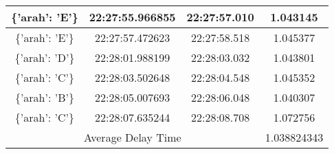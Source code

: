 \begin{longtable}{|ccc|c|}
    \multicolumn{1}{|c|}{\{'arah': 'E'\}} & \multicolumn{1}{c|}{22:27:55.966855} & 22:27:57.010       & 1.043145    \\ \hline
    \multicolumn{1}{|c|}{\{'arah': 'E'\}} & \multicolumn{1}{c|}{22:27:57.472623} & 22:27:58.518       & 1.045377    \\ \hline
    \multicolumn{1}{|c|}{\{'arah': 'D'\}} & \multicolumn{1}{c|}{22:28:01.988199} & 22:28:03.032       & 1.043801    \\ \hline
    \multicolumn{1}{|c|}{\{'arah': 'C'\}} & \multicolumn{1}{c|}{22:28:03.502648} & 22:28:04.548       & 1.045352    \\ \hline
    \multicolumn{1}{|c|}{\{'arah': 'B'\}} & \multicolumn{1}{c|}{22:28:05.007693} & 22:28:06.048       & 1.040307    \\ \hline
    \multicolumn{1}{|c|}{\{'arah': 'C'\}} & \multicolumn{1}{c|}{22:28:07.635244} & 22:28:08.708       & 1.072756    \\ \hline
    \multicolumn{3}{|c|}{Average Delay Time}                                                          & 1.038824343 \\ \hline
\end{longtable}